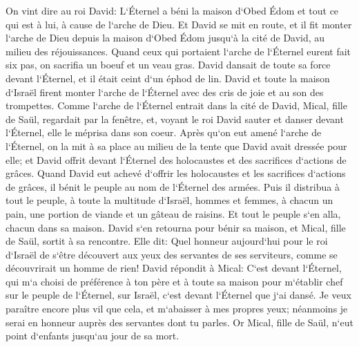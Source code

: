 \verse On vint dire au roi David: L`Éternel a béni la maison d`Obed Édom et tout ce qui est à lui, à cause de l`arche de Dieu. Et David se mit en route, et il fit monter l`arche de Dieu depuis la maison d`Obed Édom jusqu`à la cité de David, au milieu des réjouissances. 
\verse Quand ceux qui portaient l`arche de l`Éternel eurent fait six pas, on sacrifia un boeuf et un veau gras. 
\verse David dansait de toute sa force devant l`Éternel, et il était ceint d`un éphod de lin. 
\verse David et toute la maison d`Israël firent monter l`arche de l`Éternel avec des cris de joie et au son des trompettes. 
\verse Comme l`arche de l`Éternel entrait dans la cité de David, Mical, fille de Saül, regardait par la fenêtre, et, voyant le roi David sauter et danser devant l`Éternel, elle le méprisa dans son coeur. 
\verse Après qu`on eut amené l`arche de l`Éternel, on la mit à sa place au milieu de la tente que David avait dressée pour elle; et David offrit devant l`Éternel des holocaustes et des sacrifices d`actions de grâces. 
\verse Quand David eut achevé d`offrir les holocaustes et les sacrifices d`actions de grâces, il bénit le peuple au nom de l`Éternel des armées. 
\verse Puis il distribua à tout le peuple, à toute la multitude d`Israël, hommes et femmes, à chacun un pain, une portion de viande et un gâteau de raisins. Et tout le peuple s`en alla, chacun dans sa maison. 
\verse David s`en retourna pour bénir sa maison, et Mical, fille de Saül, sortit à sa rencontre. Elle dit: Quel honneur aujourd`hui pour le roi d`Israël de s`être découvert aux yeux des servantes de ses serviteurs, comme se découvrirait un homme de rien! 
\verse David répondit à Mical: C`est devant l`Éternel, qui m`a choisi de préférence à ton père et à toute sa maison pour m`établir chef sur le peuple de l`Éternel, sur Israël, c`est devant l`Éternel que j`ai dansé. 
\verse Je veux paraître encore plus vil que cela, et m`abaisser à mes propres yeux; néanmoins je serai en honneur auprès des servantes dont tu parles. 
\verse Or Mical, fille de Saül, n`eut point d`enfants jusqu`au jour de sa mort. 

